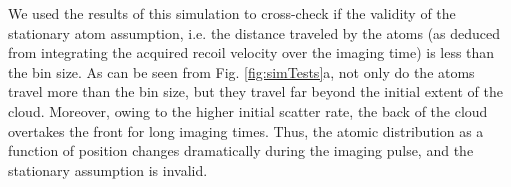 \documentclass[12pt]{iopart}
\begin{document}
\par We used the results of this simulation to cross-check if the validity of the  stationary atom assumption, i.e. the distance traveled by the atoms (as deduced from integrating the acquired recoil velocity over the imaging time) is less than the bin size. As can be seen from Fig. \ref{fig:simTests}a, not only do the atoms travel more than the bin size, but they travel far beyond the initial extent of the cloud. Moreover, owing to the higher initial scatter rate, the back of the cloud overtakes the front for long imaging times. Thus, the atomic distribution as a function of position changes dramatically during the imaging pulse, and the stationary assumption is invalid. 
\begin{figure}

\end{figure}
\end{document}
